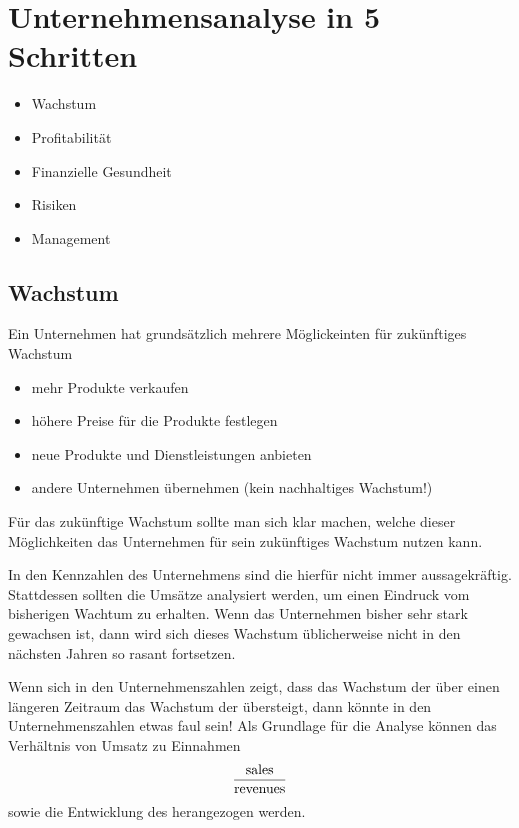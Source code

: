 

\chapter{Unternehmensanalyse in 5 Schritten}
\begin{itemize}
    \item Wachstum
    \item Profitabilität
    \item Finanzielle Gesundheit
    \item Risiken
    \item Management
\end{itemize}

\section{Wachstum}

Ein Unternehmen hat grundsätzlich mehrere Möglickeinten für zukünftiges Wachstum
\begin{itemize}
    \item mehr Produkte verkaufen
    \item höhere Preise für die Produkte festlegen
    \item neue Produkte und Dienstleistungen anbieten
    \item andere Unternehmen übernehmen (kein nachhaltiges Wachstum!)
\end{itemize}

Für das zukünftige Wachstum sollte man sich klar machen, welche dieser Möglichkeiten das Unternehmen für sein zukünftiges Wachstum nutzen kann.

In den Kennzahlen des Unternehmens sind die \earnings hierfür nicht immer aussagekräftig. 
Stattdessen sollten die Umsätze \sales analysiert werden, um einen Eindruck vom bisherigen Wachtum zu erhalten.
Wenn das Unternehmen bisher sehr stark gewachsen ist, dann wird sich dieses Wachstum üblicherweise nicht in den nächsten Jahren so rasant fortsetzen.

Wenn sich in den Unternehmenszahlen zeigt, dass das Wachstum der \earnings über einen längeren Zeitraum das Wachstum der \sales übersteigt, dann könnte in den Unternehmenszahlen etwas faul sein!
Als Grundlage für die Analyse können das Verhältnis von Umsatz zu Einnahmen
\begin{equation}
    \frac{\text{sales}}{\text{revenues}}
\end{equation}
sowie die Entwicklung des  herangezogen werden.

